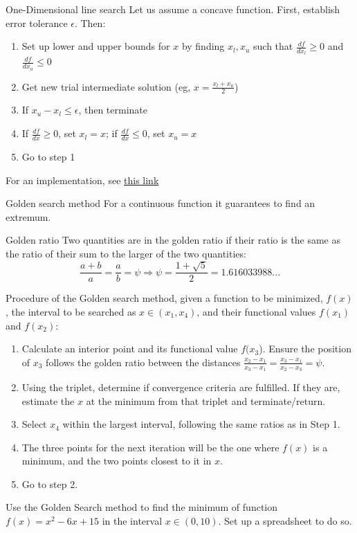 \documentclass[c]{beamer}
\begin{document}
\begin{frame}{One-Dimensional line search}
Let us assume a concave function. First, establish error tolerance $\epsilon$. Then:
  \begin{enumerate}
    \item Set up lower and upper bounds for $x$ by finding $x_l,x_u$ such that $\frac{df}{dx_l}\geq 0$ and $\frac{df}{dx_u}\leq 0$
    \item Get new trial intermediate solution (eg, $x=\frac{x_l+x_u}{2}$)
    \item If $x_u-x_l\leq \epsilon$, then terminate
    \item If $\frac{df}{dx}\geq 0$, set $x_l=x$; if $\frac{df}{dx}\leq 0$, set $x_u=x$
    \item Go to step 1
  \end{enumerate}

  For an implementation, see \href{https://machinelearningmastery.com/line-search-optimization-with-python/}{this link}
\end{frame}
\begin{frame}[allowframebreaks]{Golden search method}
For a continuous function it guarantees to find an extremum.

\begin{block}{Golden ratio}
   Two quantities are in the golden ratio if their ratio is the same as the ratio of their sum to the larger of the two quantities:
\[
\frac{a+b}{a}=\frac{a}{b}=\psi \Rightarrow \psi=\frac{1+\sqrt{5}}{2}=1.616033988...
\]
\end{block}

Procedure of the Golden search method, given a function  to be minimized, $f(x)$, the interval to be searched as $x\in(x_1,x_4)$, and their functional values $f(x_1)$ and $f(x_2)$:
\begin{enumerate}
  \item Calculate an interior point and its functional value $f(x_3$). Ensure the position of $x_3$ follows the golden ratio between the distances $\frac{x_2-x_1}{x_3-x_1}=\frac{x_3-x_1}{x_2-x_3}=\psi$.
  \item Using the triplet, determine if convergence criteria are fulfilled. If they are, estimate the $x$ at the minimum from that triplet and terminate/return.
  \item Select $x_4$ within the largest interval, following the same ratios as in Step 1.
  \item The three points for the next iteration will be the one where $f(x)$ is a minimum, and the two points closest to it in $x$.
  \item Go to step 2.
\end{enumerate}

\begin{Exercise}
  Use the Golden Search method to find the minimum of function $f(x)=x^2-6x+15$ in the interval $x\in(0,10)$. Set up a spreadsheet to do so.
\end{Exercise}

\end{frame}
\end{document}
